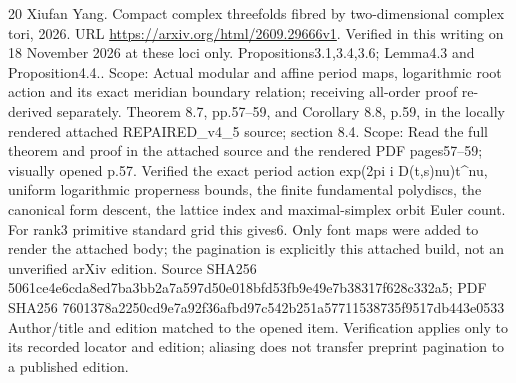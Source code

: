 \documentclass[11pt,a4paper]{article}
\theoremstyle{definition}
\begin{document}
\begin{thebibliography}{20}
Xiufan Yang.
\newblock Compact complex threefolds fibred by two-dimensional complex tori,
  2026.
\newblock URL \url{https://arxiv.org/html/2609.29666v1}.
\newblock Verified in this writing on 18 November 2026 at these loci only.
  Propositions3.1,3.4,3.6;\allowbreak{} Lemma4.3 and Proposition4.4.. Scope: Actual modular
  and affine period maps, logarithmic root action and its exact meridian
  boundary relation;\allowbreak{} receiving all-order proof re-derived separately. Theorem
  8.7, pp.57–59, and Corollary 8.8, p.59, in the locally rendered attached
  REPAIRED\_v4\_5 source;\allowbreak{} section 8.4. Scope: Read the full theorem and proof
  in the attached source and the rendered PDF pages57–59;\allowbreak{} visually opened
  p.57. Verified the exact period action exp(2pi i
  D(t,s)nu)t\textasciicircum{}nu, uniform logarithmic properness bounds, the
  finite fundamental polydiscs, the canonical form descent, the lattice index
  and maximal-simplex orbit Euler count. For rank3 primitive standard grid this
  gives6. Only font maps were added to render the attached body;\allowbreak{} the pagination
  is explicitly this attached build, not an unverified arXiv edition. Source
  SHA256 5061ce4e6cda8ed7ba3bb2a7a597d50e018bfd53fb9e49e7b38317f628c332a5;\allowbreak{} PDF
  SHA256 7601378a2250cd9e7a92f36afbd97c542b251a57711538735f9517db443e0533
  Author/title and edition matched to the opened item. Verification applies
  only to its recorded locator and edition;\allowbreak{} aliasing does not transfer preprint
  pagination to a published edition.

\end{thebibliography}
\end{document}
